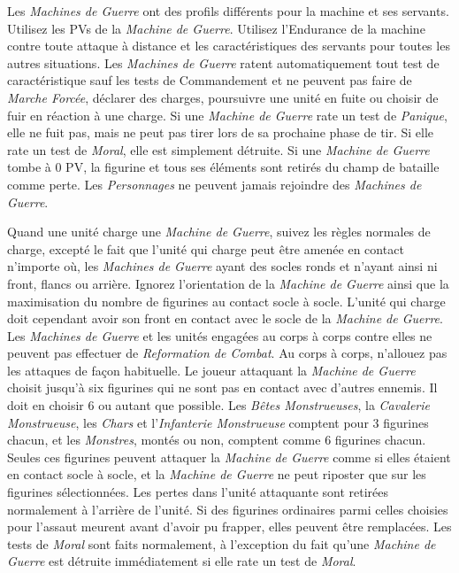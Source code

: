 Les \emph{Machines de Guerre} ont des profils différents pour la machine et ses servants. Utilisez les PVs de la \emph{Machine de Guerre}. Utilisez  l'Endurance de la machine contre toute attaque à distance et les caractéristiques des servants pour toutes les autres situations. Les \emph{Machines de Guerre} ratent automatiquement tout test de caractéristique sauf les tests de Commandement et ne peuvent pas faire de \emph{Marche Forcée}, déclarer des charges, poursuivre une unité en fuite ou choisir de fuir en réaction à une charge. Si une \emph{Machine de Guerre} rate un test de \emph{Panique}, elle ne fuit pas, mais ne peut pas tirer lors de sa prochaine phase de tir. Si elle rate un test de \emph{Moral}, elle est simplement détruite. Si une \emph{Machine de Guerre} tombe à 0 PV, la figurine et tous ses éléments sont retirés du champ de bataille comme perte. Les \emph{Personnages} ne peuvent jamais rejoindre des \emph{Machines de Guerre}.

Quand une unité charge une \emph{Machine de Guerre}, suivez les règles normales de charge, excepté le fait que l'unité qui charge peut être amenée en contact n'importe où, les \emph{Machines de Guerre} ayant des socles ronds et n'ayant ainsi ni front, flancs ou arrière. Ignorez l'orientation de la \emph{Machine de Guerre} ainsi que la maximisation du nombre de figurines au contact socle à socle. L'unité qui charge doit cependant avoir son front en contact avec le socle de la \emph{Machine de Guerre}. Les \emph{Machines de Guerre} et les unités engagées au corps à corps contre elles ne peuvent pas effectuer de \emph{Reformation de Combat}. Au corps à corps, n'allouez pas les attaques de façon habituelle. Le joueur attaquant la \emph{Machine de Guerre} choisit jusqu'à six figurines qui ne sont pas en contact avec d'autres ennemis. Il doit en choisir 6 ou autant que possible. Les \emph{Bêtes Monstrueuses}, la \emph{Cavalerie Monstrueuse}, les \emph{Chars} et l'\emph{Infanterie Monstrueuse} comptent pour 3 figurines chacun, et les \emph{Monstres}, montés ou non, comptent comme 6 figurines chacun. Seules ces figurines peuvent attaquer la \emph{Machine de Guerre} comme si elles étaient en contact socle à socle, et la \emph{Machine de Guerre} ne peut riposter que sur les figurines sélectionnées. Les pertes dans l'unité attaquante sont retirées normalement à l'arrière de l'unité. Si des figurines ordinaires parmi celles choisies pour l'assaut meurent avant d'avoir pu frapper, elles peuvent être remplacées. Les tests de \emph{Moral} sont faits normalement, à l'exception du fait qu'une \emph{Machine de Guerre} est détruite immédiatement si elle rate un test de \emph{Moral}.

